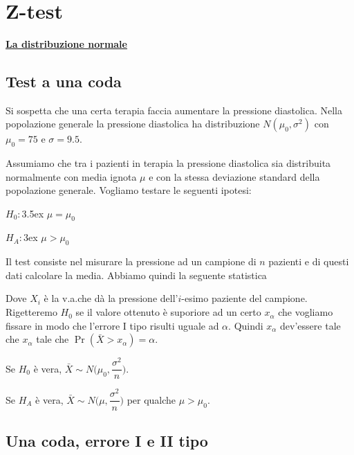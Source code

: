 \documentclass[11pt,openany]{book}
\begin{document}
\hfill{}\clearpage\
\section{Z-test}
\label{Z-test}
\hfill\textbf{{\color{brown}\hyperref[distribuzione normale]{La distribuzione normale \faShare}}}
\subsection{Test a una coda}
Si sospetta che una certa terapia faccia aumentare la pressione diastolica. Nella popolazione generale la pressione diastolica ha distribuzione $N(\mu_0,\sigma^2)$ con $\mu_0=75$ e $\sigma=9.5$. 

Assumiamo che tra i pazienti in terapia la pressione diastolica sia distribuita normalmente con media ignota $\mu$ e con la stessa deviazione standard della popolazione generale. Vogliamo testare le seguenti ipotesi:

$H_0:$\kern3.5ex $\mu=\mu_0$

$H_A:$\kern3ex $\mu>\mu_0$

Il test consiste nel misurare la pressione ad un campione di $n$ pazienti e di questi dati calcolare la media. Abbiamo quindi la seguente statistica


Dove $X_i$ è la v.a.\@ che dà la pressione dell'$i$-esimo paziente del campione. Rigetteremo $H_0$ se il
valore ottenuto è suporiore ad un certo $x_\alpha$ che vogliamo fissare in modo che l'errore I tipo risulti uguale ad $\alpha$. Quindi $x_\alpha$ dev'essere tale che $x_\alpha$ tale che $\Pr(\bar X>x_\alpha)=\alpha$.

Se $H_0$ è vera, $\bar X\sim N\bigg(\mu_0,\dfrac{\sigma^2}{n}\bigg)$.

Se $H_A$ è vera, $\bar X\sim N\bigg(\mu,\dfrac{\sigma^2}{n}\bigg)$ per qualche $\mu>\mu_0$.

% 



\hfill{}\clearpage\subsection{Una coda, errore I e II tipo}
\end{document}
